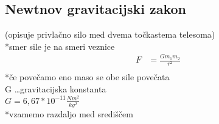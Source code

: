 {\color{indiagreen}\subsection{Newtnov gravitacijski zakon}}
(opisuje privlačno silo med dvema točkastema telesoma)\\
*smer sile je na smeri veznice
\begin{align*}
	F &= \frac{Gm_1m_2}{r^2}\\
\end{align*}
*če povečamo eno maso se obe sile povečata\\
G \dots gravitacijska konstanta\\
$G = 6,67 * 10^{-11} \frac{Nm^2}{kg^2}$\\
*vzamemo razdaljo med središčem\\

